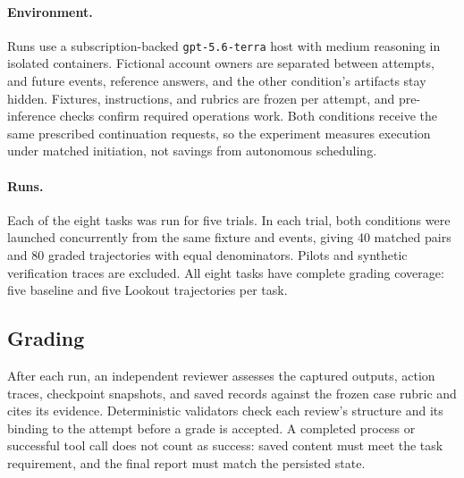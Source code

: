 \documentclass[twocolumn]{article}
\begin{document}
\paragraph{Environment.}
Runs use a subscription-backed \texttt{gpt-5.6-terra} host with medium reasoning in isolated containers. Fictional account owners are separated between attempts, and future events, reference answers, and the other condition's artifacts stay hidden. Fixtures, instructions, and rubrics are frozen per attempt, and pre-inference checks confirm required operations work. Both conditions receive the same prescribed continuation requests, so the experiment measures execution under matched initiation, not savings from autonomous scheduling.

\paragraph{Runs.}
Each of the eight tasks was run for five trials. In each trial, both conditions were launched concurrently from the same fixture and events, giving 40 matched pairs and 80 graded trajectories with equal denominators. Pilots and synthetic verification traces are excluded. All eight tasks have complete grading coverage: five baseline and five Lookout trajectories per task.

\subsection{Grading}
After each run, an independent reviewer assesses the captured outputs, action traces, checkpoint snapshots, and saved records against the frozen case rubric and cites its evidence.  Deterministic validators check each review's structure and its binding to the attempt before a grade is accepted. A completed process or successful tool call does not count as success: saved content must meet the task requirement, and the final report must match the persisted state.
\end{document}
